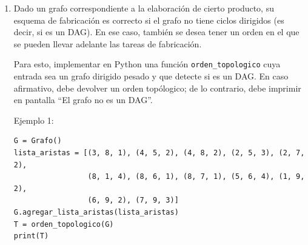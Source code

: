 \documentclass{article}
\begin{document}
\begin{enumerate}
    \item Dado un grafo correspondiente a la elaboración de cierto producto, su esquema de fabricación es correcto si el grafo no tiene ciclos dirigidos (es decir, si es un DAG). En ese caso, también se desea tener un orden en el que se pueden llevar adelante las tareas de fabricación. 
    
    Para esto, implementar en Python una función \texttt{orden\_topologico} cuya entrada sea un grafo dirigido pesado y que detecte si es un DAG. En caso afirmativo, debe devolver un orden topólogico; de lo contrario, debe imprimir en pantalla ``El grafo no es un DAG''.
    
    Ejemplo 1:
    
    \begin{center}
\end{center}

\begin{verbatim}
G = Grafo()
lista_aristas = [(3, 8, 1), (4, 5, 2), (4, 8, 2), (2, 5, 3), (2, 7, 2),
                 (8, 1, 4), (8, 6, 1), (8, 7, 1), (5, 6, 4), (1, 9, 2),
                 (6, 9, 2), (7, 9, 3)]
G.agregar_lista_aristas(lista_aristas)
T = orden_topologico(G)
print(T)
\end{verbatim}



\end{enumerate}
\end{document}
